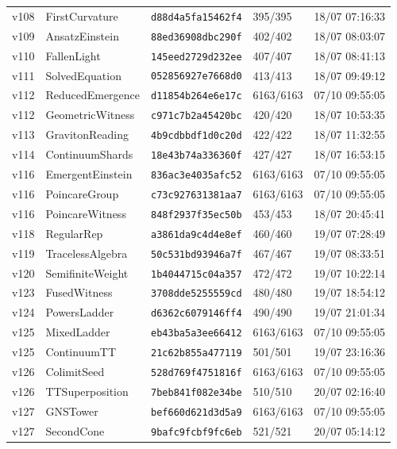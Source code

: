 \documentclass[11pt]{article}
\theoremstyle{definition}\newtheorem{deriv}{Derivação}
\begin{document}
{\begin{longtable}{@{}lllll@{}}
v108 & FirstCurvature & \texttt{d88d4a5fa15462f4} & 395/395 & 18/07 07:16:33 \\
v109 & AnsatzEinstein & \texttt{88ed36908dbc290f} & 402/402 & 18/07 08:03:07 \\
v110 & FallenLight & \texttt{145eed2729d232ee} & 407/407 & 18/07 08:41:13 \\
v111 & SolvedEquation & \texttt{052856927e7668d0} & 413/413 & 18/07 09:49:12 \\
v112 & ReducedEmergence & \texttt{d11854b264e6e17c} & 6163/6163 & 07/10 09:55:05 \\
v112 & GeometricWitness & \texttt{c971c7b2a45420bc} & 420/420 & 18/07 10:53:35 \\
v113 & GravitonReading & \texttt{4b9cdbbdf1d0c20d} & 422/422 & 18/07 11:32:55 \\
v114 & ContinuumShards & \texttt{18e43b74a336360f} & 427/427 & 18/07 16:53:15 \\
v116 & EmergentEinstein & \texttt{836ac3e4035afc52} & 6163/6163 & 07/10 09:55:05 \\
v116 & PoincareGroup & \texttt{c73c927631381aa7} & 6163/6163 & 07/10 09:55:05 \\
v116 & PoincareWitness & \texttt{848f2937f35ec50b} & 453/453 & 18/07 20:45:41 \\
v118 & RegularRep & \texttt{a3861da9c4d4e8ef} & 460/460 & 19/07 07:28:49 \\
v119 & TracelessAlgebra & \texttt{50c531bd93946a7f} & 467/467 & 19/07 08:33:51 \\
v120 & SemifiniteWeight & \texttt{1b4044715c04a357} & 472/472 & 19/07 10:22:14 \\
v123 & FusedWitness & \texttt{3708dde5255559cd} & 480/480 & 19/07 18:54:12 \\
v124 & PowersLadder & \texttt{d6362c6079146ff4} & 490/490 & 19/07 21:01:34 \\
v125 & MixedLadder & \texttt{eb43ba5a3ee66412} & 6163/6163 & 07/10 09:55:05 \\
v125 & ContinuumTT & \texttt{21c62b855a477119} & 501/501 & 19/07 23:16:36 \\
v126 & ColimitSeed & \texttt{528d769f4751816f} & 6163/6163 & 07/10 09:55:05 \\
v126 & TTSuperposition & \texttt{7beb841f082e34be} & 510/510 & 20/07 02:16:40 \\
v127 & GNSTower & \texttt{bef660d621d3d5a9} & 6163/6163 & 07/10 09:55:05 \\
v127 & SecondCone & \texttt{9bafc9fcbf9fc6eb} & 521/521 & 20/07 05:14:12 \\

\end{longtable}}
\end{document}
